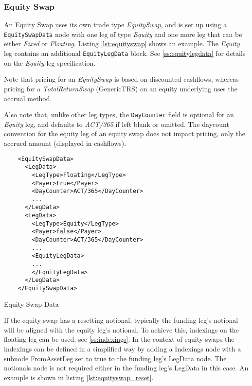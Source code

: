 \subsubsection{Equity Swap}
\label{ss:equity_swap}

An Equity Swap uses its own trade type  \emph{EquitySwap}, and is set up using a {\tt EquitySwapData} node with one leg of type  \emph{Equity} and one more leg that can be either \emph{Fixed} or  \emph{Floating}. Listing \ref{lst:equityswap} shows an example. The
\emph{Equity} leg contains an additional {\tt EquityLegData} block. See \ref{ss:equitylegdata} for details on the \emph{Equity} leg specification.

Note that pricing for an \emph{EquitySwap} is based on discounted cashflows, whereas pricing for a \emph{TotalReturnSwap} (GenericTRS) on an equity underlying uses the accrual method.

Also note that, unlike other leg types, the {\tt DayCounter} field is optional for an \emph{Equity} leg, and defaults to \emph{ACT/365} if left blank or omitted. The daycount convention for the equity leg of an equity swap does not impact pricing, only the accrued amount (displayed in cashflows).


\begin{listing}[H]
\begin{verbatim}
    <EquitySwapData>
      <LegData>
        <LegType>Floating</LegType>
        <Payer>true</Payer>
        <DayCounter>ACT/365</DayCounter>
        ...
      </LegData>
      <LegData>
        <LegType>Equity</LegType>
        <Payer>false</Payer>
        <DayCounter>ACT/365</DayCounter>
        ...
        <EquityLegData>
        ...
        </EquityLegData>
      </LegData>
    </EquitySwapData>
\end{verbatim}
\caption{Equity Swap Data}
\label{lst:equityswap}
\end{listing}

If the equity swap has a resetting notional, typically the funding leg's notional will be aligned with the equity leg's
notional. To achieve this, indexings on the floating leg can be used, see \ref{ss:indexings}. In the context of equity
swaps the indexings can be defined in a simplified way by adding a Indexings node with a subnode FromAssetLeg set to
true to the funding leg's LegData node. The notionals node is not required either in the funding leg's LegData in this
case. An example is shown in listing \ref{lst:equityswap_reset}.

